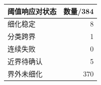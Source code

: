 \begin{tabular}{lr}
\toprule
阈值响应对状态 & 数量/384\\
\midrule
细化稳定 & 8\\
分类跨界 & 1\\
连续失败 & 0\\
近界待确认 & 5\\
界外未细化 & 370\\
\bottomrule
\end{tabular}
